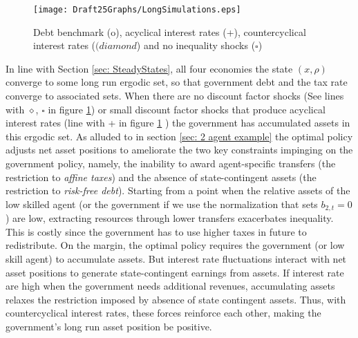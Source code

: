 \documentclass[thmsb,11pt]{article}
\begin{document}
  \begin{figure}[htp]
 \centering
 \texttt{[image: Draft25Graphs/LongSimulations.eps]}
 \caption{Debt benchmark (o), acyclical interest rates (+), countercyclical interest rates ($(diamond$) and no inequality shocks \scriptsize ($\square$\normalsize) }
 \label{fig:LongSimulations}
 \end{figure}

\smallskip


In line with Section \ref{sec: SteadyStates}, all four economies the state $(x,\rho)$   converge to some long run
ergodic set, so that government debt and the tax rate converge to associated sets. When there are no discount factor shocks
(See lines with {$\diamond$, \scriptsize  $\square$ \normalsize}in figure \ref{fig:LongSimulations}) or small discount factor shocks that produce acyclical interest rates (line with + in figure \ref{fig:LongSimulations} )
the government has accumulated assets in this ergodic set. As alluded to in section \ref{sec: 2 agent example} %
 the optimal policy adjusts  net asset
positions to ameliorate the two key constraints impinging  on the government policy, namely,
the inability to award agent-specific transfers (the restriction to \emph{affine taxes}) and the  absence of state-contingent assets (the
restriction to \emph {risk-free debt}). Starting from a point when the
relative assets of the low skilled agent (or the government if we use the
 normalization that sets $b_{2,t} = 0$) are low, extracting resources through lower
transfers exacerbates inequality. This is costly since the government has to
use higher taxes in future to redistribute. On the margin, the optimal policy requires the government (or low skill agent) to accumulate assets. But  interest rate
fluctuations interact with net asset positions to generate state-contingent  earnings
from assets. If interest rate are high when the government needs additional
revenues, accumulating assets relaxes the restriction imposed by absence
of state contingent assets. Thus, with countercyclical interest rates, these
forces reinforce each other, making the government's  long run asset position be positive.
\end{document}
